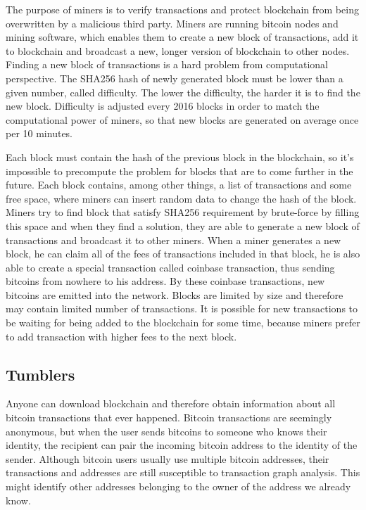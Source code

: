 \documentclass[
  digital, %
  table,   %
  lof,     %
  lot,     %
  oneside
]{fithesis3}
\begin{document}
The purpose of miners is to verify transactions and protect blockchain
from being overwritten by a malicious third party.
Miners are running bitcoin nodes and mining software,
which enables them to create a new block of transactions,
add it to blockchain and broadcast a new, longer version of blockchain to other nodes.
Finding a new block of transactions is a hard problem from computational perspective.
The SHA256 hash of newly generated block must be lower than a given number, called difficulty.
The lower the difficulty, the harder it is to find the new block.
Difficulty is adjusted every 2016 blocks in order to match the computational power of miners,
so that new blocks are generated on average once per 10 minutes.

Each block must contain the hash of the previous block in the blockchain, so it's impossible
to precompute the problem for blocks that are to come further in the future. 
Each block contains, among other things, a list of transactions and some free space,
where miners can insert random data to change the hash of the block.
Miners try to find block that satisfy SHA256 requirement
by brute-force by filling this space and when they find a solution,
they are able to generate a new block of transactions and broadcast it to other miners.
When a miner generates a new block, he can claim all of the fees of transactions included in that block,
he is also able to create a special transaction called coinbase transaction, thus sending bitcoins from
nowhere to his address. By these coinbase transactions, new bitcoins are emitted into the network.
Blocks are limited by size and therefore may contain limited number of transactions.
It is possible for new transactions to be waiting for being added to the blockchain for some time,
because miners prefer to add transaction with higher fees to the next block.

\subsection{Tumblers}
Anyone can download blockchain and therefore obtain information about all bitcoin transactions that ever happened.
Bitcoin transactions are seemingly anonymous, but when the user sends bitcoins to
someone who knows their identity, the recipient can pair the incoming bitcoin address
to the identity of the sender.
Although bitcoin users usually use multiple bitcoin addresses,
their transactions and addresses are still 
susceptible to transaction graph analysis.
This might identify other addresses belonging to the owner of the address we already know.
\end{document}
